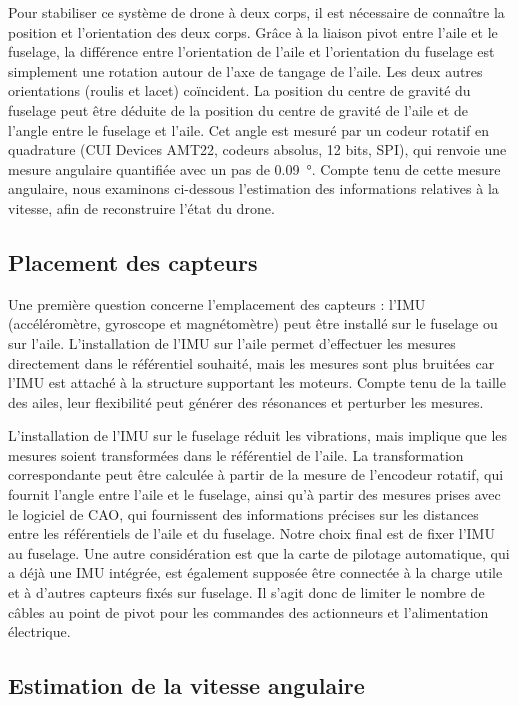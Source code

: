 Pour stabiliser ce système de drone à deux corps, il est nécessaire de connaître la position et l'orientation des deux corps. Grâce à la liaison pivot entre l'aile et le fuselage, la différence entre l'orientation de l'aile et l'orientation du fuselage est simplement une rotation autour de l'axe de tangage de l'aile. Les deux autres orientations (roulis et lacet) coïncident. La position du centre de gravité du fuselage peut être déduite de la position du centre de gravité de l'aile et de l'angle entre le fuselage et l'aile. Cet angle est mesuré par un codeur rotatif en quadrature (CUI Devices AMT22, codeurs absolus, 12 bits, SPI), qui renvoie une mesure angulaire quantifiée avec un pas de \SI{0,09}{\degree}. Compte tenu de cette mesure angulaire, nous examinons ci-dessous l'estimation des informations relatives à la vitesse, afin de reconstruire l'état du drone.

\subsection{Placement des capteurs}
\label{subsec:sens_pos}
Une première question concerne l'emplacement des capteurs : l'IMU (accéléromètre, gyroscope et magnétomètre) peut être installé sur le fuselage ou sur l'aile. 
L'installation de l'IMU sur l'aile permet d'effectuer les mesures directement dans le référentiel souhaité, mais les mesures sont plus bruitées car l'IMU est attaché à la structure supportant les moteurs. Compte tenu de la taille des ailes, leur flexibilité peut générer des résonances et perturber les mesures. 

L'installation de l'IMU sur le fuselage réduit les vibrations, mais implique que les mesures soient transformées dans le référentiel de l'aile. La transformation correspondante peut être calculée à partir de la mesure de l'encodeur rotatif, qui fournit l'angle entre l'aile et le fuselage, ainsi qu'à partir des mesures prises avec le logiciel de CAO, qui fournissent des informations précises sur les distances entre les référentiels de l'aile et du fuselage. Notre choix final est de fixer l'IMU au fuselage. Une autre considération est que la carte de pilotage automatique, qui a déjà une IMU intégrée, est également supposée être connectée à la charge utile et à d'autres capteurs fixés sur fuselage. Il s'agit donc de limiter le nombre de câbles au point de pivot pour les commandes des actionneurs et l'alimentation électrique.


\subsection{Estimation de la vitesse angulaire}


